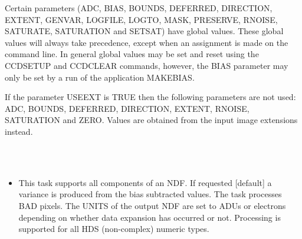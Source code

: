 \documentclass[twoside,11pt]{article}
\newcommand{\htmlref}[2]{#1}
\renewcommand{\_}{\texttt{\symbol{95}}}
\newcommand{\xroutine}[1]{\htmlref{{\sc #1}}{#1}}
\newcommand{\sstimplementationstatus}[1]{
   \item[{Implementation Status:}] \mbox{} \\[1.3ex] #1}
\newcommand{\sstitemlist}[1]{
  \mbox{} \\
  \vspace{-3.5ex}
  \begin{itemize}
     #1
  \end{itemize}
}
\newcommand{\sstitem}{\item}
\newcommand{\sstimplementationstatus}[1]{
      \item[Implementation Status:] #1
   }
\newcommand{\sstitemlist}[1]{
      \begin{itemize}
         #1
      \end{itemize}
      \\
   }
\newcommand{\sstitem}{\item}
\begin{document}
{{      Certain parameters (ADC, BIAS, BOUNDS, DEFERRED, DIRECTION,
      EXTENT, GENVAR, LOGFILE, LOGTO, MASK, PRESERVE, RNOISE, SATURATE,
      SATURATION and SETSAT) have global values. These global values
      will always take precedence, except when an assignment is made on
      the command line.  In general global values may be set and reset
      using the \xroutine{CCDSETUP} and \xroutine{CCDCLEAR} commands, however, the BIAS
      parameter may only be set by a run of the application \xroutine{MAKEBIAS}.

      If the parameter USEEXT is TRUE then the following parameters
      are not used: ADC, BOUNDS, DEFERRED, DIRECTION, EXTENT, RNOISE,
      SATURATION and ZERO. Values are obtained from the input image
      extensions instead.
   }
   \sstimplementationstatus{
      \sstitemlist{

         \sstitem
         This task supports all components of an NDF. If requested
           [default] a variance is produced from the bias subtracted
           values. The task processes BAD pixels. The UNITS of the output
           NDF are set to ADUs or electrons depending on whether data
           expansion has occurred or not. Processing is supported for all
           HDS (non-complex) numeric types.
      }
   }
}
\end{document}
